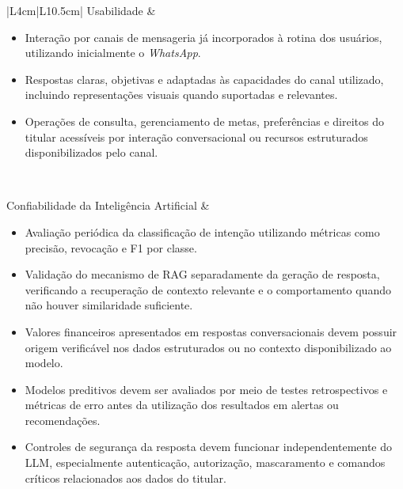 {\begin{longtable}{|L{4cm}|L{10.5cm}|}
Usabilidade &
\begin{minipage}[t]{\linewidth}
\begin{itemize}[noitemsep,topsep=2pt,leftmargin=*]
    \item Interação por canais de mensageria já incorporados à rotina dos usuários, utilizando inicialmente o \textit{WhatsApp}.
    \item Respostas claras, objetivas e adaptadas às capacidades do canal utilizado, incluindo representações visuais quando suportadas e relevantes.
    \item Operações de consulta, gerenciamento de metas, preferências e direitos do titular acessíveis por interação conversacional ou recursos estruturados disponibilizados pelo canal.
\end{itemize}
\end{minipage} \\ \hline

Confiabilidade da Inteligência Artificial &
\begin{minipage}[t]{\linewidth}
\begin{itemize}[noitemsep,topsep=2pt,leftmargin=*]
    \item Avaliação periódica da classificação de intenção utilizando métricas como precisão, revocação e F1 por classe.
    \item Validação do mecanismo de RAG separadamente da geração de resposta, verificando a recuperação de contexto relevante e o comportamento quando não houver similaridade suficiente.
    \item Valores financeiros apresentados em respostas conversacionais devem possuir origem verificável nos dados estruturados ou no contexto disponibilizado ao modelo.
    \item Modelos preditivos devem ser avaliados por meio de testes retrospectivos e métricas de erro antes da utilização dos resultados em alertas ou recomendações.
    \item Controles de segurança da resposta devem funcionar independentemente do LLM, especialmente autenticação, autorização, mascaramento e comandos críticos relacionados aos dados do titular.
\end{itemize}
\end{minipage} \\ \hline


\end{longtable}}
